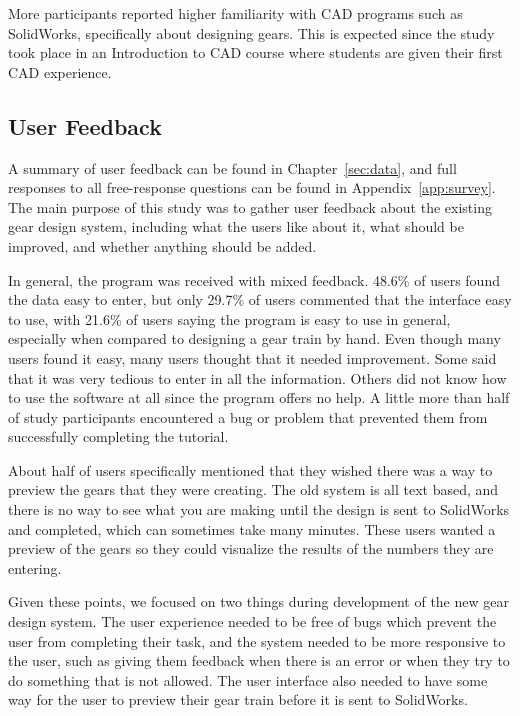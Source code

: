 \begin{doublespace}
More participants reported higher familiarity with CAD programs such as SolidWorks, specifically about designing gears. This is expected since the study took place in an Introduction to CAD course where students are given their first CAD experience.

\subsection{User Feedback}

A summary of user feedback can be found in Chapter~\ref{sec:data}, and full responses to all free-response questions can be found in Appendix~\ref{app:survey}. The main purpose of this study was to gather user feedback about the existing gear design system, including what the users like about it, what should be improved, and whether anything should be added.

In general, the program was received with mixed feedback. 48.6\% of users found the data easy to enter, but only 29.7\% of users commented that the interface easy to use, with 21.6\% of users saying the program is easy to use in general, especially when compared to designing a gear train by hand. Even though many users found it easy, many users thought that it needed improvement. Some said that it was very tedious to enter in all the information. Others did not know how to use the software at all since the program offers no help. A little more than half of study participants encountered a bug or problem that prevented them from successfully completing the tutorial.

About half of users specifically mentioned that they wished there was a way to preview the gears that they were creating. The old system is all text based, and there is no way to see what you are making until the design is sent to SolidWorks and completed, which can sometimes take many minutes. These users wanted a preview of the gears so they could visualize the results of the numbers they are entering.

Given these points, we focused on two things during development of the new gear design system. The user experience needed to be free of bugs which prevent the user from completing their task, and the system needed to be more responsive to the user, such as giving them feedback when there is an error or when they try to do something that is not allowed. The user interface also needed to have some way for the user to preview their gear train before it is sent to SolidWorks.


\end{doublespace}
